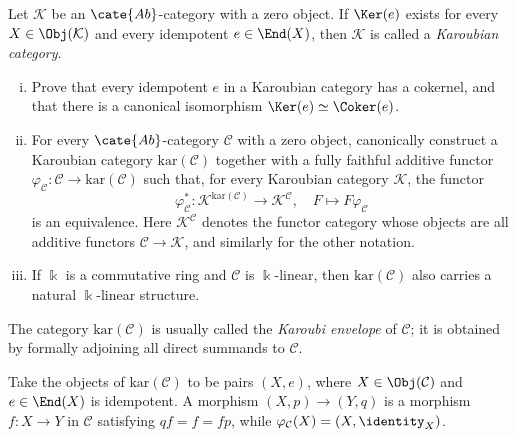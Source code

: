 \begin{Exercises}
	\item Let $\mathcal{K}$ be an $\cate{Ab}$-category with a zero object. If
	$\Ker(e)$ exists for every $X\in\Obj(\mathcal{K})$ and every idempotent
	$e\in\End(X)$, then $\mathcal{K}$ is called a \emph{Karoubian category}.
	\begin{enumerate}[(i)]
		\item Prove that every idempotent $e$ in a Karoubian category has a
		cokernel, and that there is a canonical isomorphism
		$\Ker(e)\simeq\Coker(e)$.
		\item For every $\cate{Ab}$-category $\mathcal{C}$ with a zero object,
		canonically construct a Karoubian category $\mathrm{kar}(\mathcal{C})$
		together with a fully faithful additive functor
		$\varphi_{\mathcal{C}}:\mathcal{C}\to\mathrm{kar}(\mathcal{C})$ such
		that, for every Karoubian category $\mathcal{K}$, the functor
		\[ \varphi_{\mathcal{C}}^*:
		\mathcal{K}^{\mathrm{kar}(\mathcal{C})}\to
		\mathcal{K}^{\mathcal{C}},\quad F\mapsto F\varphi_{\mathcal{C}} \]
		is an equivalence. Here $\mathcal{K}^{\mathcal{C}}$ denotes the functor
		category whose objects are all additive functors
		$\mathcal{C}\to\mathcal{K}$, and similarly for the other notation.
		\item If $\Bbbk$ is a commutative ring and $\mathcal{C}$ is
		$\Bbbk$-linear, then $\mathrm{kar}(\mathcal{C})$ also carries a natural
		$\Bbbk$-linear structure.
	\end{enumerate}
	The category $\mathrm{kar}(\mathcal{C})$ is usually called the
	\emph{Karoubi envelope} of $\mathcal{C}$; it is obtained by formally
	adjoining all direct summands to $\mathcal{C}$.

	\begin{hint}
		Take the objects of $\mathrm{kar}(\mathcal{C})$ to be pairs $(X,e)$,
		where $X\in\Obj(\mathcal{C})$ and $e\in\End(X)$ is idempotent. A
		morphism $(X,p)\to(Y,q)$ is a morphism $f:X\to Y$ in $\mathcal{C}$
		satisfying $qf=f=fp$, while
		$\varphi_{\mathcal{C}}(X)=(X,\identity_X)$.
	\end{hint}


\end{Exercises}
